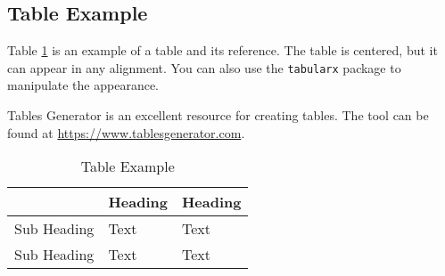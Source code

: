 \subsection{Table Example}

Table \ref{table:table-example} is an example of a table and its reference. The table is centered, but it can appear in any alignment. You can also use the \texttt{tabularx} package to manipulate the appearance.

Tables Generator is an excellent resource for creating tables. The tool can be found at \url{https://www.tablesgenerator.com}.

\vspace{0.25cm}

\begin{table}[ht]
    \centering
    \begin{tabular}{l|l|l|}
        \cline{2-3}
                                          & \textbf{Heading} & \textbf{Heading} \\ \hline
        \multicolumn{1}{|l|}{Sub Heading} & Text             & Text             \\ \hline
        \multicolumn{1}{|l|}{Sub Heading} & Text             & Text             \\ \hline
    \end{tabular}
    \caption{Table Example}
    \label{table:table-example}
\end{table}

